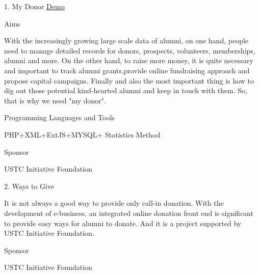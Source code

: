 \documentclass[10pt,letterpaper]{article}
\renewenvironment{itemize}{
  \begin{list}{}{
    \setlength{\leftmargin}{1.5em}
    \setlength{\itemsep}{0.25em}
    \setlength{\parskip}{0pt}
    \setlength{\parsep}{0.25em}
  }
}{
  \end{list}
}
\begin{document}
\begin{itemize}
\item  1. My Donor \href{https://admin.ustcif.org/mydonor/frontend/root.php/}{\underline{Demo}}
	\begin{itemize}
	\item Aims
		\begin{itemize}
		\item With the increasingly growing large scale data of alumni, on one hand, people need to manage detailed records for donors, prospects, volunteers, memberships, alumni and more. On the other hand, to raise more money, it is quite necessary and important to track alumni grants,provide online fundraising approach and propose capital campaigns. Finally and also the most important thing is how to dig out those potential kind-hearted alumni and keep in touch with them. So, that is why we need "my donor". 
		\end{itemize}
	\item Programming Languages and Tools
		\begin{itemize}
		\item PHP+XML+ExtJS+MYSQL+ Statistics Method
		\end{itemize}
	\item Sponsor
		\begin{itemize}
		\item USTC Initiative Foundation
		\end{itemize}
	\end{itemize}

\item  2. Ways to Give 
	\begin{itemize}
	\item It is not always a good way to provide only call-in donation. With the development of e-business, an integrated online donation front end is significant to provide easy ways for alumni to donate.  And it is a project supported by USTC Initiative Foundation.
	\item Sponsor
		\begin{itemize}
		\item USTC Initiative Foundation
		\end{itemize}
	\end{itemize}


\end{itemize}
\end{document}
